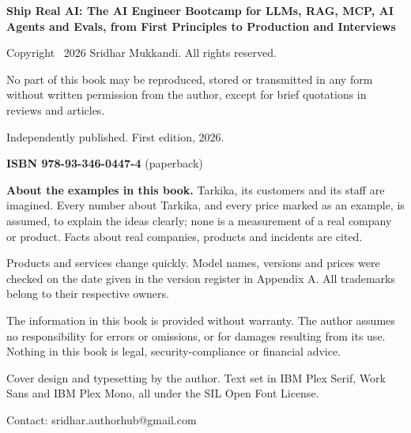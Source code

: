 {\sffamily\fontsize{7.2}{10}\selectfont\color{slate}\raggedright
\textbf{Ship Real AI: The AI Engineer Bootcamp for LLMs, RAG, MCP, AI Agents and Evals, from First Principles to Production and Interviews}\par\medskip
Copyright \textcopyright\ 2026 Sridhar Mukkandi. All rights reserved.\par\medskip
No part of this book may be reproduced, stored or transmitted in any form without written permission from the
author, except for brief quotations in reviews and articles.\par\medskip
Independently published. First edition, 2026.\par\medskip
\textbf{ISBN 978-93-346-0447-4} (paperback)\par\medskip
\textbf{About the examples in this book.} Tarkika, its customers and its staff are imagined. Every number about
Tarkika, and every price marked as an example, is assumed, to explain the ideas clearly; none is a measurement of
a real company or product. Facts about real companies, products and incidents are cited.\par\medskip
Products and services change quickly. Model names, versions and prices were checked on the date given in the version
register in Appendix A. All trademarks belong to their respective owners.\par\medskip
The information in this book is provided without warranty. The author assumes no responsibility for errors or
omissions, or for damages resulting from its use. Nothing in this book is legal, security-compliance or financial
advice.\par\medskip
Cover design and typesetting by the author. Text set in IBM Plex Serif, Work Sans and IBM Plex Mono, all under the
SIL Open Font License.\par\medskip
Contact: sridhar.authorhub@gmail.com\par}
\clearpage
